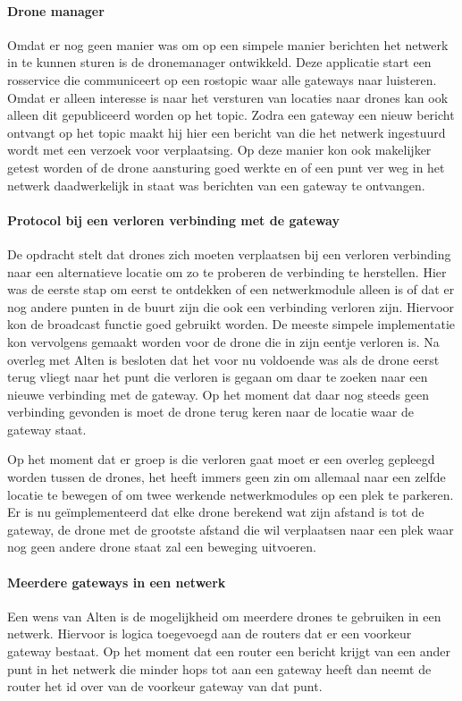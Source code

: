 \documentclass[a4paper, 11pt, oneside]{report}
\begin{document}
\paragraph{Drone manager}
Omdat er nog geen manier was om op een simpele manier berichten het netwerk in te kunnen sturen is de dronemanager ontwikkeld. Deze applicatie start een rosservice die communiceert op een rostopic waar alle gateways naar luisteren. Omdat er alleen interesse is naar het versturen van locaties naar drones kan ook alleen dit gepubliceerd worden op het topic. Zodra een gateway een nieuw bericht ontvangt op het topic maakt hij hier een bericht van die het netwerk ingestuurd wordt met een verzoek voor verplaatsing. Op deze manier kon ook makelijker getest worden of de drone aansturing goed werkte en of een punt ver weg in het netwerk daadwerkelijk in staat was berichten van een gateway te ontvangen.

\paragraph{Protocol bij een verloren verbinding met de gateway}
De opdracht stelt dat drones zich moeten verplaatsen bij een verloren verbinding naar een alternatieve locatie om zo te proberen de verbinding te herstellen. Hier was de eerste stap om eerst te ontdekken of een netwerkmodule alleen is of dat er nog andere punten in de buurt zijn die ook een verbinding verloren zijn. Hiervoor kon de broadcast functie goed gebruikt worden. De meeste simpele implementatie kon vervolgens gemaakt worden voor de drone die in zijn eentje verloren is. Na overleg met Alten is besloten dat het voor nu voldoende was als de drone eerst terug vliegt naar het punt die verloren is gegaan om daar te zoeken naar een nieuwe verbinding met de gateway. Op het moment dat daar nog steeds geen verbinding gevonden is moet de drone terug keren naar de locatie waar de gateway staat.   

Op het moment dat er groep is die verloren gaat moet er een overleg gepleegd worden tussen de drones, het heeft immers geen zin om allemaal naar een zelfde locatie te bewegen of om twee werkende netwerkmodules op een plek te parkeren. 
Er is nu geïmplementeerd dat elke drone berekend wat zijn afstand is tot de gateway, de drone met de grootste afstand die wil verplaatsen naar een plek waar nog geen andere drone staat zal een beweging uitvoeren.  
   
\paragraph{Meerdere gateways in een netwerk}
Een wens van Alten is de mogelijkheid om meerdere drones te gebruiken in een netwerk. 
Hiervoor is logica toegevoegd aan de routers dat er een voorkeur gateway bestaat.
Op het moment dat een router een bericht krijgt van een ander punt in het netwerk die minder hops tot aan een gateway heeft dan neemt de router het id over van de voorkeur gateway van dat punt. 
\end{document}
